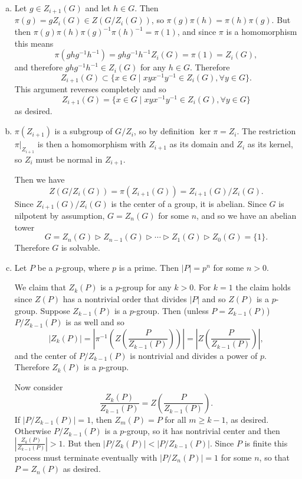 \documentclass{article}
\begin{document}
\begin{Answer}
\begin{enumerate}[(a)]
  \item{
    Let $g \in Z_{i+1}(G)$ and let $h \in G$. Then
    $\pi(g) = g Z_{i}(G) \in Z(G / Z_i(G))$,
    so $\pi(g) \pi(h) = \pi(h) \pi(g)$. But then
    $\pi(g)\pi(h)\pi(g)^{-1}\pi(h)^{-1} = \pi(1)$, and since $\pi$ is
    a homomorphism this means
    $$
      \pi(ghg^{-1}h^{-1})
    = ghg^{-1}h^{-1} Z_i(G)
    = \pi(1)
    = Z_i(G),
    $$
    and therefore $ghg^{-1}h^{-1} \in Z_i(G)$ for any $h \in
    G$. Therefore
    $$
    Z_{i+1}(G) \subset \{ x \in G
                         \mid
                         xyx^{-1}y^{-1} \in Z_i(G), \forall y \in G
                      \}.
    $$
    This argument reverses completely and so
    $$
    Z_{i+1}(G) =\{ x \in G
                  \mid
                  xyx^{-1}y^{-1} \in Z_i(G), \forall y \in G
               \}
    $$
    as desired.
  }
  \item{
    $\pi(Z_{i+1})$ is a subgroup of $G / Z_i$, so by definition
    $\ker \pi = Z_i$. The restriction
    $\left.\pi\right|_{Z_{i+1}}$ is then a homomorphism with
    $Z_{i+1}$  as its domain and $Z_i$ as its kernel, so
    $Z_i$ must be normal in $Z_{i+1}$.

    Then we have
    $$
      Z(G / Z_{i}(G))
    = \pi(Z_{i+1}(G))
    = Z_{i+1}(G) / Z_{i}(G).
    $$
    Since $Z_{i+1}(G) / Z_{i}(G)$ is the center of a group, it is
    abelian. Since $G$ is nilpotent by assumption, $G = Z_n(G)$ for
    some $n$, and so we have an abelian tower
    $$
    G = Z_n(G)
    \triangleright Z_{n-1}(G)
    \triangleright \cdots
    \triangleright Z_1(G)
    \triangleright Z_0(G) = \{ 1 \}.
    $$
    Therefore $G$ is solvable.
  }
  \item{
    Let $P$ be a $p$-group, where $p$ is a prime.
    Then $|P| = p^n$ for some $n > 0$.

    We claim that $Z_k(P)$ is a $p$-group for any $k > 0$.
    For $k = 1$ the claim holds since $Z(P)$ has a nontrivial order
    that divides $|P|$ and so $Z(P)$ is a $p$-group.
    Suppose $Z_{k-1}(P)$ is a $p$-group. Then (unless $P =
    Z_{k-1}(P)$) $P / Z_{k-1}(P)$ is as
    well and so
    $$
      |Z_k(P)|
    = \left|\pi^{-1}\left(Z\left(\frac{P}{Z_{k-1}(P)}\right)\right)\right|
    = \left|Z\left(\frac{P}{Z_{k-1}(P)}\right)\right|,
    $$
    and the center of $P / Z_{k-1}(P)$ is nontrivial and divides a
    power of $p$. Therefore $Z_k(P)$ is a $p$-group.

    Now consider
    $$
    \frac{Z_k(P)}{Z_{k-1}(P)} = Z\left(\frac{P}{Z_{k-1}(P)}\right).
    $$
    If $|P / Z_{k-1}(P)| = 1$, then $Z_{m}(P) = P$ for all $m \geq
    k-1$, as desired. Otherwise $P / Z_{k-1}(P)$ is a $p$-group,
    so it has nontrivial center and then
    $\left|\frac{Z_k(P)}{Z_{k-1}(P)}\right| > 1$. But then
    $|P / Z_k(P)| < |P / Z_{k-1}(P)|$. Since $P$ is finite this
    process must terminate eventually with $|P / Z_n(P)| = 1$ for some
    $n$, so that $P = Z_n(P)$ as desired.

}
\end{enumerate}
\end{Answer}
\end{document}
